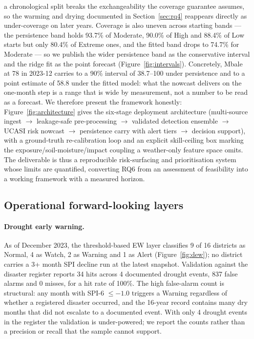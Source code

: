 \documentclass[preprint,12pt]{elsarticle}
\begin{document}
a chronological split breaks the exchangeability the coverage guarantee assumes,
so the warming and drying documented in Section~\ref{sec:rq4} reappears directly
as under-coverage on later years. Coverage is also uneven across starting bands
--- the persistence band holds 93.7\% of Moderate, 90.0\% of High and 88.4\% of
Low starts but only 80.4\% of Extreme ones, and the fitted band drops to 74.7\%
for Moderate
--- so we publish the wider persistence band as the conservative interval and the
ridge fit as the point forecast (Figure~\ref{fig:intervals}). Concretely, Mbale
at 78 in 2023-12 carries to a 90\% interval of 38.7--100 under persistence and to
a point estimate of 58.8 under the fitted model: what the nowcast delivers on the
one-month step is a range that is wide by measurement, not a number to be read as
a forecast. We therefore present the framework honestly:
Figure~\ref{fig:architecture} gives the six-stage deployment architecture
(multi-source ingest $\rightarrow$ leakage-safe
pre-processing $\rightarrow$ validated detection ensemble $\rightarrow$ UCASI risk
nowcast $\rightarrow$ persistence carry with alert tiers $\rightarrow$ decision
support), with a ground-truth re-calibration loop and an explicit skill-ceiling
box marking the exposure/soil-moisture/impact coupling a weather-only feature
space omits. The deliverable is thus a reproducible risk-surfacing and
prioritisation system whose limits are quantified, converting RQ6 from an
assessment of feasibility into a working framework with a measured horizon.

\subsection{Operational forward-looking layers}\label{sec:forward}

\paragraph{Drought early warning.}
As of December 2023, the threshold-based EW layer classifies 9 of 16
districts as Normal, 4 as Watch, 2 as Warning and 1 as Alert
(Figure~\ref{fig:dew}); no district carries a 3+ month SPI decline run at the
latest snapshot. Validation against the disaster register reports 34 hits across
4 documented drought events, 837 false alarms and 0 misses, for a hit rate of
100\%. The high false-alarm count is structural: any month with SPI-6 $\leq -1.0$
triggers a Warning regardless of whether a registered disaster occurred, and the
16-year record contains many dry months that did not escalate to a documented
event. With only 4 drought events in the register the validation is
under-powered; we report the counts rather than a precision or recall that the
sample cannot support.
\end{document}
